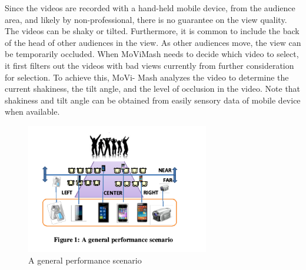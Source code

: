 \documentclass{sig-alternate}
\begin{document}
Since the videos are recorded with a hand-held mobile device,
from the audience area, and likely by non-professional, there is no
guarantee on the view quality. The videos can be shaky or tilted.
Furthermore, it is common to include the back of the head of other
audiences in the view. As other audiences move, the view can be
temporarily occluded. When MoViMash needs to decide which
video to select, it first filters out the videos with bad views currently
from further consideration for selection. To achieve this, MoVi-
Mash analyzes the video to determine the current shakiness, the tilt
angle, and the level of occlusion in the video. Note that shakiness and tilt angle can be obtained from easily sensory data of mobile
device when available.\par
\begin{figure}[htp]
\centering
\includegraphics[width=8cm]{first.png}
\caption{A general performance scenario}
\label{fig:lion}
\end{figure}
\end{document}
